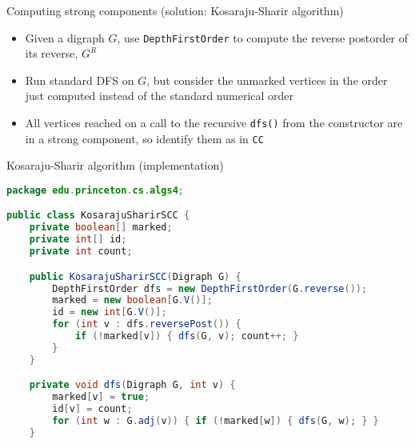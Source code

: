 \documentclass[8pt,a4paper,compress]{beamer}
\begin{document}
\begin{frame}[fragile]
\pause

Computing strong components (solution: Kosaraju-Sharir algorithm)
\begin{itemize}
\item Given a digraph $G$, use \lstinline{DepthFirstOrder} to compute the reverse postorder of its reverse, $G^R$

\item Run standard DFS on $G$, but consider the unmarked vertices in the order just computed instead of the standard numerical order

\item All vertices reached on a call to the recursive \lstinline{dfs()} from the constructor are in a strong component, so identify them as in \lstinline{CC}
\end{itemize}

\pause
\bigskip

Kosaraju-Sharir algorithm (implementation)
\begin{lstlisting}[language=Java]
package edu.princeton.cs.algs4;

public class KosarajuSharirSCC {
    private boolean[] marked; 
    private int[] id;  
    private int count;  

    public KosarajuSharirSCC(Digraph G) {
        DepthFirstOrder dfs = new DepthFirstOrder(G.reverse());
        marked = new boolean[G.V()];
        id = new int[G.V()];
        for (int v : dfs.reversePost()) {
            if (!marked[v]) { dfs(G, v); count++; }
        }
    }

    private void dfs(Digraph G, int v) { 
        marked[v] = true;
        id[v] = count;
        for (int w : G.adj(v)) { if (!marked[w]) { dfs(G, w); } }
    }    
\end{lstlisting}
\end{frame}
\end{document}

